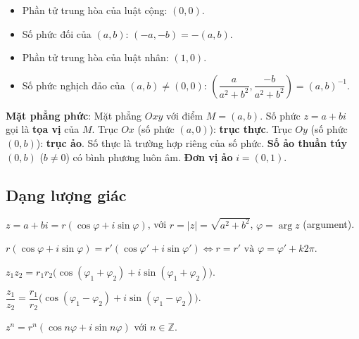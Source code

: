 \documentclass[12pt,a4paper]{article}
\begin{document}
\begin{tinhchat}[title={$\mathbb{C}$ là trường}]
  \begin{itemize}
    \item Phần tử trung hòa của luật cộng: $(0, 0)$.
    \item Số phức đối của $(a, b)$: $(-a, -b) = -(a, b)$.
    \item Phần tử trung hòa của luật nhân: $(1, 0)$.
    \item Số phức nghịch đảo của $(a, b) \ne (0, 0)$: $\left(\dfrac{a}{a^2 + b^2}, \dfrac{-b}{a^2 + b^2}\right) = (a, b)^{-1}$.
  \end{itemize}
\end{tinhchat}

\begin{dinhnghia}
  \textbf{Mặt phẳng phức}: Mặt phẳng $Oxy$ với điểm $M = (a, b)$. Số phức $z = a + bi$ gọi là \textbf{tọa vị} của $M$. Trục $Ox$ (số phức $(a, 0)$): \textbf{trục thực}. Trục $Oy$ (số phức $(0, b)$): \textbf{trục ảo}. Số thực là trường hợp riêng của số phức. \textbf{Số ảo thuần túy} $(0, b)$ ($b \ne 0$) có bình phương luôn âm. \textbf{Đơn vị ảo} $i = (0, 1)$.
\end{dinhnghia}

\subsection{Dạng lượng giác}

\begin{dinhnghia}
  $z = a + bi = r(\cos\varphi + i\sin\varphi)$, với $r = |z| = \sqrt{a^2 + b^2}$, $\varphi = \arg z$ (argument).
\end{dinhnghia}

\begin{tinhchat}
  $r(\cos\varphi + i\sin\varphi) = r'(\cos\varphi' + i\sin\varphi') \Leftrightarrow r = r' \text{ và } \varphi = \varphi' + k2\pi$.
\end{tinhchat}

\begin{congthuc}[title={Nhân và chia}]
  $z_1 z_2 = r_1 r_2\bigl(\cos(\varphi_1 + \varphi_2) + i\sin(\varphi_1 + \varphi_2)\bigr)$.
  
  $\dfrac{z_1}{z_2} = \dfrac{r_1}{r_2}\bigl(\cos(\varphi_1 - \varphi_2) + i\sin(\varphi_1 - \varphi_2)\bigr)$.
\end{congthuc}

\begin{congthuc}[title={Công thức Moivre}]
  $z^n = r^n(\cos n\varphi + i\sin n\varphi)$ với $n \in \mathbb{Z}$.
\end{congthuc}
\end{document}
